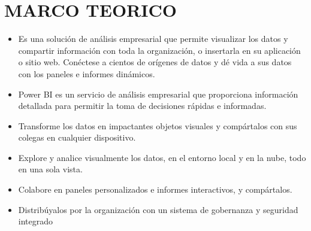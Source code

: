 \documentclass[12pt,letterpaper]{article}
\begin{document}
\section{MARCO TEORICO}
\begin{itemize}
\subsection{Power Bi:}
	\item Es una solución de análisis empresarial que permite visualizar los datos y compartir información con toda la organización, o insertarla en su aplicación o sitio web. Conéctese a cientos de orígenes de datos y dé vida a sus datos con los paneles e informes dinámicos.
	\item	Power BI es un servicio de análisis empresarial que proporciona información detallada para permitir la toma de decisiones rápidas e informadas.
\item Transforme los datos en impactantes objetos visuales y compártalos con sus colegas en cualquier dispositivo.
\item Explore y analice visualmente los datos, en el entorno local y en la nube, todo en una sola vista.
\item Colabore en paneles personalizados e informes interactivos, y compártalos.
\item Distribúyalos por la organización con un sistema de gobernanza y seguridad integrado


\end{itemize}
\end{document}
